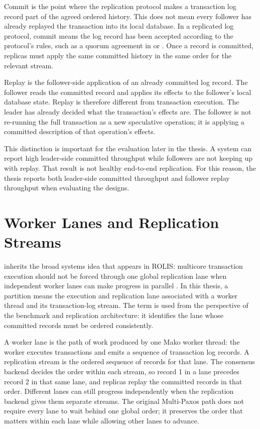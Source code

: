 Commit is the point where the replication protocol makes a transaction log
record part of the agreed ordered history. This does not mean every follower has
already replayed the transaction into its local database. In a replicated log
protocol, commit means the log record has been accepted according to the
protocol's rules, such as a quorum agreement in \Paxos{} or \Raft{}. Once a
record is committed, replicas must apply the same committed history in the same
order for the relevant stream.

Replay is the follower-side application of an already committed log record.
The follower reads the committed record and applies its effects to the
follower's local database state. Replay is therefore different from transaction
execution. The leader has already decided what the transaction's effects are.
The follower is not re-running the full transaction as a new speculative
operation; it is applying a committed description of that operation's effects.

This distinction is important for the evaluation later in the thesis. A system
can report high leader-side committed throughput while followers are not keeping
up with replay. That result is not healthy end-to-end replication. For this
reason, the thesis reports both leader-side committed throughput and follower
replay throughput when evaluating the \Raft{} designs.

\section{Worker Lanes and Replication Streams}

\Mako{} inherits the broad systems idea that appears in ROLIS: multicore
transaction execution should not be forced through one global replication lane
when independent worker lanes can make progress in parallel
\cite{rolis-eurosys22}. In this thesis, a partition means the execution and
replication lane associated with a worker thread and its transaction-log
stream. The term is used from the perspective of the benchmark and replication
architecture: it identifies the lane whose committed records must be ordered
consistently.

A worker lane is the path of work produced by one Mako worker thread: the
worker executes transactions and emits a sequence of transaction log records.
A replication stream is the ordered sequence of records for that lane. The
consensus backend decides the order within each stream, so record 1 in a lane
precedes record 2 in that same lane, and replicas replay the committed records
in that order. Different lanes can still progress independently when the
replication backend gives them separate streams. The original Multi-Paxos path
does not require every lane to wait behind one global order; it preserves the
order that matters within each lane while allowing other lanes to advance.


